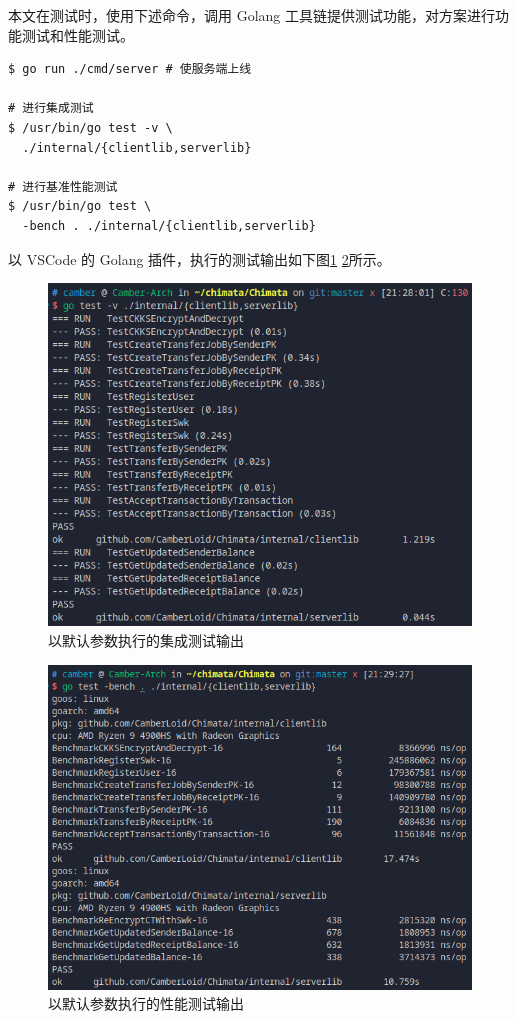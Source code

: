 本文在测试时，使用下述命令，调用 Golang 工具链提供测试功能，对方案进行功能测试和性能测试。

\pagebreak

\begin{verbatim}
$ go run ./cmd/server # 使服务端上线

# 进行集成测试
$ /usr/bin/go test -v \
  ./internal/{clientlib,serverlib}

# 进行基准性能测试
$ /usr/bin/go test \
  -bench . ./internal/{clientlib,serverlib}
\end{verbatim}

以 VSCode 的 Golang 插件，执行的测试输出如下图\ref{Fig:test} \ref{Fig:benchmark}所示。 

\begin{figure}[ht]
    \centering
    \includegraphics[width=0.9\linewidth]{./Figures/Test.png}
    \caption{以默认参数执行的集成测试输出}\label{Fig:test}
\end{figure}

\begin{figure}[ht]
    \centering
    \includegraphics[width=0.9\linewidth]{./Figures/Bench_Overall.png}
    \caption{以默认参数执行的性能测试输出}\label{Fig:benchmark}
\end{figure}

